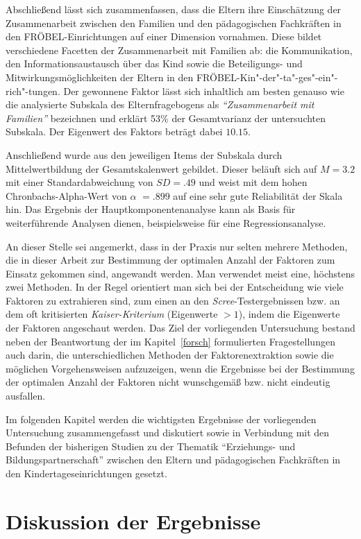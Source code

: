 \documentclass[12pt,a4paper]{article}
\begin{document}
	Abschließend lässt sich zusammenfassen, dass die Eltern ihre Einschätzung der Zusammenarbeit zwischen den Familien und den pädagogischen Fachkräften in den FRÖBEL-Einrichtungen auf einer Dimension vornahmen. Diese bildet verschiedene Facetten der Zusammenarbeit mit Familien ab: die Kommunikation, den Informationsaustausch über das Kind sowie die Beteiligungs- und Mitwirkungsmöglichkeiten der Eltern in den FRÖBEL-Kin"-der"-ta"-ges"-ein"-rich"-tungen. Der gewonnene Faktor lässt sich inhaltlich am besten genauso wie die analysierte Subskala des Elternfragebogens als \textit{"`Zusammenarbeit mit Familien"'} bezeichnen und erklärt 53\% der Gesamtvarianz der untersuchten Subskala. Der Eigenwert des Faktors beträgt dabei $10.15$.
	
	Anschließend wurde aus den jeweiligen Items der Subskala durch Mittelwertbildung der Gesamtskalenwert gebildet. Dieser beläuft sich auf  $M = 3.2$ mit einer Standardabweichung von $SD = .49$ und weist mit dem hohen Chronbachs-Alpha-Wert von $\alpha$ $= .899$ auf eine sehr gute Reliabilität der Skala hin.
	Das Ergebnis der Hauptkomponentenanalyse kann als Basis für weiterführende Analysen dienen, beispielsweise für eine Regressionsanalyse.
	
An dieser Stelle sei angemerkt, dass in der Praxis nur selten mehrere Methoden, die in dieser Arbeit zur Bestimmung der optimalen Anzahl der Faktoren zum Einsatz gekommen sind, angewandt werden. Man verwendet meist eine, höchstens zwei Methoden. In der Regel orientiert man sich bei der Entscheidung wie viele Faktoren zu extrahieren sind, zum einen an den \textit{Scree}-Testergebnissen bzw. an dem oft kritisierten \textit{Kaiser-Kriterium} (Eigenwerte $>1$), indem die Eigenwerte der Faktoren angeschaut werden. Das Ziel der vorliegenden Untersuchung bestand neben der Beantwortung der im Kapitel~\ref{forsch} formulierten Fragestellungen auch darin, die unterschiedlichen Methoden der Faktorenextraktion sowie die möglichen Vorgehensweisen aufzuzeigen, wenn die Ergebnisse bei der Bestimmung der optimalen Anzahl der Faktoren nicht wunschgemäß bzw. nicht eindeutig ausfallen.

	Im folgenden Kapitel werden die wichtigsten Ergebnisse der vorliegenden Untersuchung zusammengefasst und diskutiert sowie in Verbindung mit den Befunden der bisherigen Studien zu der Thematik "`Erziehungs- und Bildungspartnerschaft"' zwischen den Eltern und pädagogischen Fachkräften in den Kindertageseinrichtungen gesetzt.

\section{Diskussion der Ergebnisse}
\label{disk}
\end{document}
